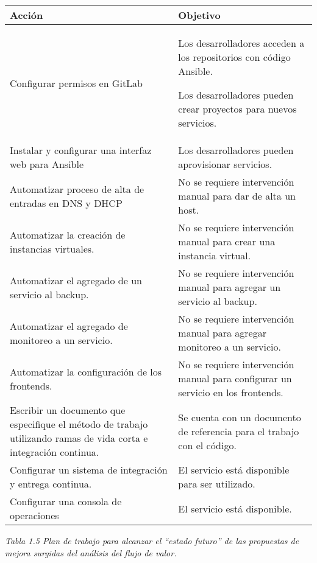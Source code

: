 \begin{tabular}{|l|l|}
\hline
Acción & Objetivo \\ \hline
Configurar permisos en GitLab & Los desarrolladores acceden a los repositorios con código Ansible.

Los desarrolladores pueden crear proyectos para nuevos servicios. \\ \hline
Instalar y configurar una interfaz web para Ansible & Los desarrolladores pueden aprovisionar servicios. \\ \hline
Automatizar proceso de alta de entradas en DNS y DHCP & No se requiere intervención manual para dar de alta un host. \\ \hline
Automatizar la creación de instancias virtuales. & No se requiere intervención manual para crear una instancia virtual. \\ \hline
Automatizar el agregado de un servicio al backup. & No se requiere intervención manual para agregar un servicio al backup. \\ \hline
Automatizar el agregado de monitoreo a un servicio. & No se requiere intervención manual para agregar monitoreo a un servicio. \\ \hline
Automatizar la configuración de los frontends. & No se requiere intervención manual para configurar un servicio en los frontends. \\ \hline
Escribir un documento que especifique el método de trabajo utilizando ramas de vida corta e integración continua. & Se cuenta con un documento de referencia para el trabajo con el código. \\ \hline
Configurar un sistema de integración y entrega continua. & El servicio está disponible para ser utilizado. \\ \hline
Configurar una consola de operaciones & El servicio está disponible. \\ \hline
\end{tabular}
\textit{Tabla 1.5 Plan de trabajo para alcanzar el “estado futuro” de las propuestas de mejora surgidas del análisis del flujo de valor.}


